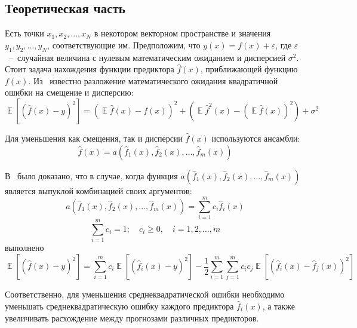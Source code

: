 \documentclass[12pt, fleqn]{article}
\newcommand{\expectation}{\mathop{\mathbb{E}}}
\newcommand{\predictionfunction}{\hat{f}}
\newcommand{\ensemblefunction}{a}
\newcommand{\numberobjects}{N}
\newcommand{\numberpredictionfunctions}{m}
\newcommand{\ensemblefunctionfull}{\ensemblefunction(\predictionfunction_1(x), \predictionfunction_2(x), \dots, \predictionfunction_\numberpredictionfunctions(x))}
\newcommand{\for}[3]{\sum\limits_{#1 = #2}^{#3}}  %
\newcommand{\forn}[2]{\for{#1}{1}{#2}}  %
\newcommand{\forin}[1]{\forn{i}{#1}}  %
\begin{document}
\subsection{Теоретическая часть}
Есть точки $x_1, x_2, ..., x_\numberobjects$ в некотором векторном пространстве и значения $y_1, y_2, \dots, y_\numberobjects$, соответствующие им.
Предположим, что $y(x) = f(x) + \varepsilon$, где $\varepsilon$~--~случайная величина с нулевым математическим ожиданием и дисперсией $\sigma^2$. Стоит задача нахождения функции предиктора $\predictionfunction(x)$, приближающей функцию $f(x)$. Из~\cite{BiasVarianceDecompositionZeroOneSquaredLoss} известно разложение математического ожидания квадратичной ошибки на смещение и дисперсию:
\begin{equation*}
\expectation \left[ \left( \predictionfunction(x) - y \right)^2 \right] =
\left(
	\expectation \predictionfunction(x) - f(x)
\right)^2  +
\left(
	\expectation \predictionfunction^2(x) - \left(\expectation \predictionfunction(x)\right)^2
\right) + \sigma^2
\end{equation*}

Для уменьшения как смещения, так и дисперсии $\predictionfunction(x)$ используются ансамбли:
\begin{equation*}
\predictionfunction(x) = \ensemblefunctionfull
\end{equation*}

В~\cite{OptimalConvexCorrectingProcedures} было доказано, что в случае, когда функция $\ensemblefunctionfull$ является выпуклой комбинацией своих аргументов:
\begin{equation*}
\ensemblefunctionfull = 
\forn{i}{\numberpredictionfunctions} c_i \predictionfunction_i(x)
\end{equation*}
\begin{equation*}
\forin{\numberpredictionfunctions} c_i = 1; \quad c_i \geq 0, \quad i = 1, 2, \dots, \numberpredictionfunctions
\end{equation*}
выполнено
\begin{equation*}
\expectation \left[\left( \predictionfunction(x) - y \right)^2 \right] =
\forn{i}{\numberpredictionfunctions} c_i
\expectation \left[ \left(
	\predictionfunction_i(x) - y
\right)^2 \right] 
- \dfrac{1}{2}
\forn{i}{\numberpredictionfunctions} \forn{j}{\numberpredictionfunctions} c_i c_j
\expectation \left[ \left(
	\predictionfunction_i(x) - \predictionfunction_j(x)
\right)^2 \right]
\end{equation*}

Соответственно, для уменьшения среднеквадратической ошибки необходимо уменьшать среднеквадратическую ошибку каждого предиктора $\predictionfunction_i(x)$, а также увеличивать расхождение между прогнозами различных предикторов.
\end{document}
